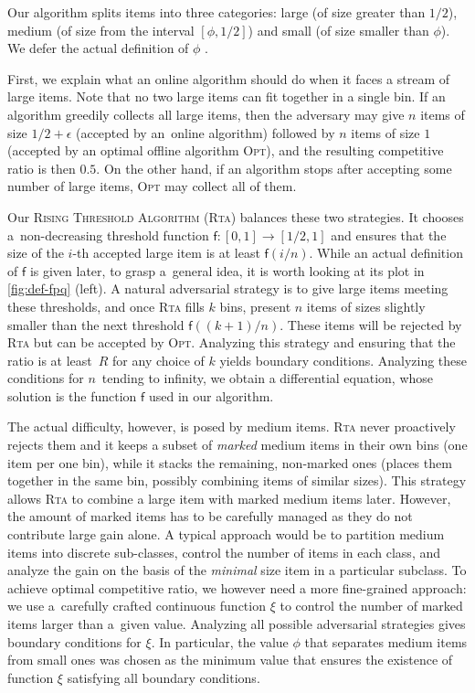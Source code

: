 \documentclass[a4paper,USenglish,cleveref]{lipics-v2019}
\newcommand{\R}{\ensuremath{R}}
\newcommand{\smallBoundary}{\ensuremath{\phi}}
\newcommand{\f}{\textsf{f}}
\newcommand{\g}{\ensuremath{\xi}}
\newcommand{\ALG}{\textsc{Rta}\xspace}
\newcommand{\OPT}{\textsc{Opt}\xspace}
\newcommand\maciek[1]{\texthl{#1}}
\begin{document}
Our algorithm splits items into three categories: large (of size greater than
$1/2$), medium (of size from the interval $[\smallBoundary, 1/2]$) and small (of size
smaller than $\smallBoundary$). We defer the actual definition of $\smallBoundary$ \maciek{and for now we note that it is approximately $0.21$}. 

First, we explain what an online algorithm should do when it faces a stream of
large items. Note that no two large items can fit together in a single bin. If
an algorithm greedily collects all large items, then the adversary may give $n$
items of size $1/2+\epsilon$ (accepted by an~online algorithm) followed by $n$
items of size $1$ (accepted by an optimal offline algorithm \OPT), and the 
resulting competitive ratio is then $0.5$. On the other
hand, if an algorithm stops after accepting some number of large items, 
\OPT may collect all of them. 

Our \textsc{Rising Threshold Algorithm} (\ALG) balances these two strategies. It
chooses a~non-decreasing threshold function $\f: [0,1] \to [1/2,1]$ and ensures
that the size of the $i$-th accepted large item is at least $\f(i/n)$. While an
actual definition of $\f$ is given later, to grasp a~general idea, it is worth
looking at its plot in \cref{fig:def-fpq} (left). A natural adversarial strategy
is to give large items meeting these thresholds, and once \ALG fills $k$ bins, \maciek{to}
present $n$ items of sizes slightly smaller than the next threshold
$\f((k+1)/n)$. These items will be rejected by \ALG but can be accepted by \OPT.
Analyzing this strategy and ensuring that the ratio is at least~$\R$ for any
choice of $k$ yields \maciek{the} boundary conditions. Analyzing these conditions for 
$n$~tending to infinity, we obtain a differential equation, whose solution is the
function $\f$ used in our algorithm.

The actual difficulty, however, is posed by medium items. \ALG never proactively
rejects them and it keeps a subset of \emph{marked} medium items in their own
bins (one item per one bin), while it stacks the remaining, non-marked ones
(places them together in the same bin, possibly combining items of similar
sizes). This strategy allows \ALG to combine a large item with marked medium
items later. However, the amount of marked items has to be carefully managed as
they do not contribute large gain alone. A typical approach would be to
partition medium items into discrete sub-classes, control the number of items in
each class, and analyze the gain on the basis of the \emph{minimal} size item in
a particular subclass. To achieve optimal competitive ratio, we however need a
more fine-grained approach: we use a~carefully crafted continuous function $\g$
to control the number of marked items larger than a~given value. Analyzing all
possible adversarial strategies gives boundary conditions for $\g$. In
particular, the value $\smallBoundary$ that separates medium items from small
ones was chosen as the minimum value that ensures the existence of function $\g$
satisfying all boundary conditions.
\end{document}

